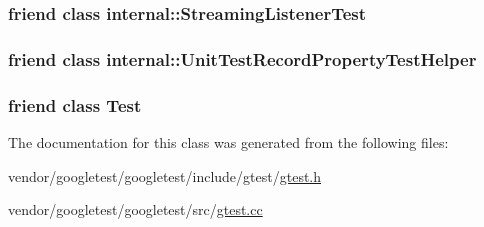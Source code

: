 \subsubsection[{\texorpdfstring{internal\+::\+Streaming\+Listener\+Test}{internal::StreamingListenerTest}}]{\setlength{\rightskip}{0pt plus 5cm}friend class internal\+::\+Streaming\+Listener\+Test\hspace{0.3cm}{\ttfamily [friend]}}\hypertarget{classtesting_1_1UnitTest_adc037d188dab349a94868991955c9cd4}{}\label{classtesting_1_1UnitTest_adc037d188dab349a94868991955c9cd4}
\subsubsection[{\texorpdfstring{internal\+::\+Unit\+Test\+Record\+Property\+Test\+Helper}{internal::UnitTestRecordPropertyTestHelper}}]{\setlength{\rightskip}{0pt plus 5cm}friend class {\bf internal\+::\+Unit\+Test\+Record\+Property\+Test\+Helper}\hspace{0.3cm}{\ttfamily [friend]}}\hypertarget{classtesting_1_1UnitTest_ae970f89a9f477a349fe5778be85ef42e}{}\label{classtesting_1_1UnitTest_ae970f89a9f477a349fe5778be85ef42e}
\subsubsection[{\texorpdfstring{Test}{Test}}]{\setlength{\rightskip}{0pt plus 5cm}friend class {\bf Test}\hspace{0.3cm}{\ttfamily [friend]}}\hypertarget{classtesting_1_1UnitTest_a5b78b1c2e1fa07ffed92da365593eaa4}{}\label{classtesting_1_1UnitTest_a5b78b1c2e1fa07ffed92da365593eaa4}


The documentation for this class was generated from the following files\+:\begin{DoxyCompactItemize}
\item 
vendor/googletest/googletest/include/gtest/\hyperlink{gtest_8h}{gtest.\+h}\item 
vendor/googletest/googletest/src/\hyperlink{gtest_8cc}{gtest.\+cc}\end{DoxyCompactItemize}
